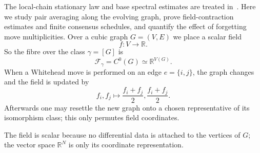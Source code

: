 \documentclass[11pt]{article}
\newcommand{\R}{\mathbb R}
\newcommand{\F}{\mathcal F}
\theoremstyle{definition}
\begin{document}
The local-chain stationary law and base spectral estimates are treated
in~\cite{local-whitehead}. Here we study pair averaging along the
evolving graph, prove field-contraction estimates and finite consensus
schedules, and quantify the effect of forgetting move multiplicities.
Over a cubic graph $G=(V,E)$ we place a scalar field
\[
    f:V\to\R.
\]
So the fibre over the class $\gamma=[G]$ is
\[
    \F_\gamma=C^0(G)\simeq \R^{V(G)}.
\]
When a Whitehead move is performed on an edge $e=\{i,j\}$, the graph changes and
the field is updated by
\[
    f_i,f_j
    \mapsto
    \frac{f_i+f_j}{2},\frac{f_i+f_j}{2}.
\]
Afterwards one may resettle the new graph onto a chosen representative of its
isomorphism class; this only permutes field coordinates.

The field is scalar because no differential data is attached to the vertices
of $G$; the vector space $\R^N$ is only its coordinate representation.
\end{document}
